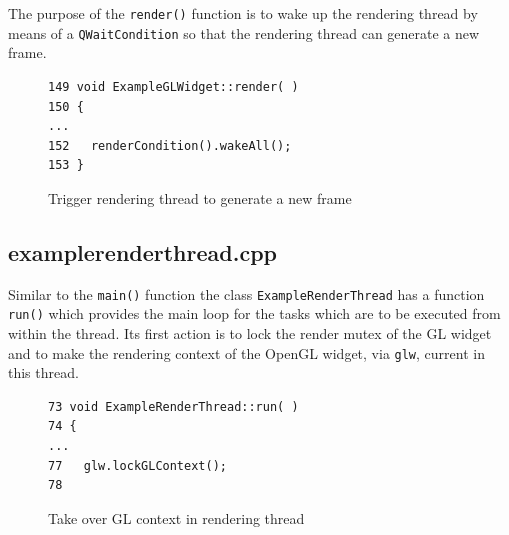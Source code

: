 \documentclass[jou,noapacite]{apa}
\begin{document}
The purpose of the \lstinline|render()| function is to wake up the rendering
thread by means of a \lstinline|QWaitCondition| so that the rendering thread can
generate a new frame.
%
\begin{figure}[h]
\begin{lstlisting}[basicstyle=\scriptsize]
149 void ExampleGLWidget::render( )
150 {
...
152   renderCondition().wakeAll();
153 }
\end{lstlisting}
\caption{Trigger rendering thread to generate a new frame}
\end{figure}

\subsection{examplerenderthread.cpp}

Similar to the \lstinline|main()| function the
class \lstinline|ExampleRenderThread| has a function \lstinline|run()| which
provides the main loop for the tasks which are to be executed from within the
thread.
%
Its first action is to lock the render mutex of the GL widget and to make the
rendering context of the OpenGL widget, via \lstinline|glw|, current in this
thread.
%
\begin{figure}[h]
\begin{lstlisting}[basicstyle=\scriptsize]
73 void ExampleRenderThread::run( )
74 {
...
77   glw.lockGLContext();
78
\end{lstlisting}
\caption{Take over GL context in rendering thread}
\end{figure}
%
\end{document}
